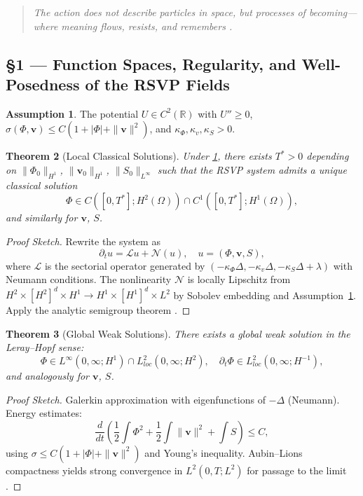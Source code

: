 \documentclass[11pt]{article}
\newtheorem{theorem}{Theorem}[section]
\theoremstyle{definition}
\newtheorem{assumption}[theorem]{Assumption}
\theoremstyle{remark}
\newcommand{\vect}[1]{\bm{#1}}
\newcommand{\norm}[1]{\lVert #1\rVert}
\begin{document}
\begin{quote}\emph{
The action does not describe particles in space, but \emph{processes of becoming}—where meaning flows, resists, and remembers \cite{Barad2007}.
}\end{quote}

\subsection*{§1 — Function Spaces, Regularity, and Well-Posedness of the RSVP Fields}

\begin{assumption}
\label{ass:wellposed}
The potential $U \in C^2(\mathbb{R})$ with $U'' \ge 0$, $\sigma(\Phi,\vect{v}) \le C(1 + |\Phi| + \|\vect{v}\|^2)$, and $\kappa_\Phi, \kappa_v, \kappa_S > 0$.
\end{assumption}

\begin{theorem}[Local Classical Solutions]
Under \cref{ass:wellposed}, there exists $T^* > 0$ depending on $\norm{\Phi_0}_{H^1}$, $\norm{\vect{v}_0}_{H^1}$, $\norm{S_0}_{L^\infty}$ such that the RSVP system admits a unique classical solution
\[
\Phi \in C([0,T^*]; H^2(\Omega)) \cap C^1([0,T^*]; H^1(\Omega)),
\]
and similarly for $\vect{v}$, $S$.
\end{theorem}

\begin{proof}[Proof Sketch]
Rewrite the system as
\[
\partial_t u = \mathcal{L} u + \mathcal{N}(u), \quad u = (\Phi, \vect{v}, S),
\]
where $\mathcal{L}$ is the sectorial operator generated by $(-\kappa_\Phi \Delta, -\kappa_v \Delta, -\kappa_S \Delta + \lambda)$ with Neumann conditions. The nonlinearity $\mathcal{N}$ is locally Lipschitz from $H^2 \times [H^2]^d \times H^1 \to H^1 \times [H^1]^d \times L^2$ by Sobolev embedding and Assumption~\ref{ass:wellposed}. Apply the analytic semigroup theorem \cite[Thm.~3.3.3]{Pazy1983}.
\end{proof}

\begin{theorem}[Global Weak Solutions]
\label{thm:global_weak}
There exists a global weak solution in the Leray–Hopf sense:
\[
\Phi \in L^\infty(0,\infty; H^1) \cap L^2_{loc}(0,\infty; H^2),\quad \partial_t \Phi \in L^2_{loc}(0,\infty; H^{-1}),
\]
and analogously for $\vect{v}$, $S$.
\end{theorem}

\begin{proof}[Proof Sketch]
Galerkin approximation with eigenfunctions of $-\Delta$ (Neumann). Energy estimates:
\[
\frac{d}{dt} \left( \frac{1}{2} \int \Phi^2 + \frac{1}{2} \int \|\vect{v}\|^2 + \int S \right) \le C,
\]
using $\sigma \le C(1 + |\Phi| + \|\vect{v}\|^2)$ and Young’s inequality. Aubin–Lions compactness yields strong convergence in $L^2(0,T; L^2)$ for passage to the limit \cite{Lions1969}.
\end{proof}
\end{document}
